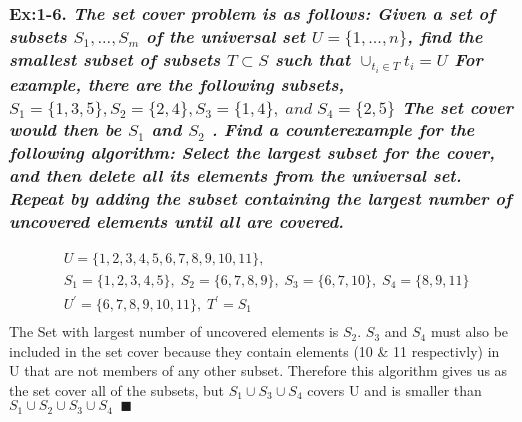 \subsubsection*{\textbf{\enspace Ex:1-6.} \emph{\textbf{The set cover problem is as follows: } Given a set of subsets $S_{1}, ..., S_{m}$ of the universal set 
$U = \{1, ..., n\}$, 
find the smallest subset of subsets 
$T \subset S$ 
such that  
$\cup_{t_{i} \in T}t_{i} = U$ For example, there are the following subsets, $S_{1} = \{1, 3, 5\}, S_{2} = \{2, 4\}, S_{3} = \{1, 4\}, \; and \; S_{4} = \{2, 5\}$ The set cover would then be $S_{1}$ and $S_{2}$ . } 
\emph{\textbf{Find a counterexample for the following algorithm:} Select the largest subset for the cover, and then delete all its elements from the universal set. Repeat by adding the subset containing the largest number of uncovered elements until all are covered.}}
{\color{answer}{}
\begin{align*}
	&U = \{1,2,3,4,5,6,7,8,9,10,11\}, \\
	&S_{1} = \{1,2,3,4,5\}, \; S_{2} = \{6,7,8,9\}, \; S_{3} = \{6,7,10\}, \; S_{4} = \{8,9,11\} \\
	&U^{'} = \{6,7,8,9,10,11\}, \; T^{'} = S_{1} \\
\end{align*}
The Set with largest number of uncovered elements is $S_{2}$. $S_{3}$ and $S_{4}$ must also be included in the set cover because they contain elements (10 \& 11 respectivly)
in U that are not members of any other subset. Therefore this algorithm gives us as the set cover all of the subsets, but $S_{1} \cup S_{3} \cup S_{4}$ covers U and is smaller
than $S_{1} \cup S_{2} \cup S_{3} \cup S_{4}\;\;\blacksquare$ 
}








